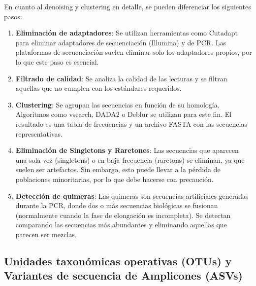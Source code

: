 En cuanto al denoising y clustering en detalle, se pueden diferenciar los siguientes pasos:
\begin{enumerate}
\item \textbf{Eliminación de adaptadores}: Se utilizan herramientas como Cutadapt para eliminar adaptadores de secuenciación (Illumina) y de PCR. Las plataformas de secuenciación suelen eliminar solo los adaptadores propios, por lo que este paso es esencial.
\item \textbf{Filtrado de calidad}: Se analiza la calidad de las lecturas y se filtran aquellas que no cumplen con los estándares requeridos.
\item \textbf{Clustering}: Se agrupan las secuencias en función de su homología. Algoritmos como vsearch, DADA2 o Deblur se utilizan para este fin. El resultado es una tabla de frecuencias y un archivo FASTA con las secuencias representativas.
\item \textbf{Eliminación de Singletons y Raretones}: Las secuencias que aparecen una sola vez (singletons) o en baja frecuencia (raretons) se eliminan, ya que suelen ser artefactos. Sin embargo, esto puede llevar a la pérdida de poblaciones minoritarias, por lo que debe hacerse con precaución.
\item \textbf{Detección de quimeras}: Las quimeras son secuencias artificiales generadas durante la PCR, donde dos o más secuencias biológicas se fusionan (normalmente cuando la fase de elongación es incompleta). Se detectan comparando las secuencias más abundantes y eliminando aquellas que parecen ser mezclas.
\end{enumerate}

\subsection{Unidades taxonómicas operativas (OTUs) y Variantes de secuencia de Amplicones (ASVs)}
